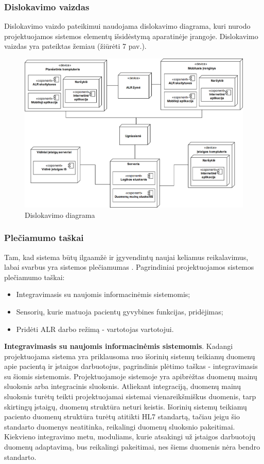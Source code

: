 \subsubsection{Dislokavimo vaizdas}
Dislokavimo vaizdo pateikimui naudojama dislokavimo diagrama, kuri nurodo projektuojamos sistemos elementų išsidėstymą aparatinėje įrangoje. Dislokavimo vaizdas yra pateiktas žemiau (žiūrėti 7 pav.).
\begin{figure}[H]
    \centering
    \includegraphics[scale=0.27]{images/deployment}
    \caption{Dislokavimo diagrama}
\end{figure}

\subsubsection{Plečiamumo taškai}
Tam, kad sistema būtų ilgaamžė ir įgyvendintų naujai keliamus reikalavimus, labai svarbus yra sistemos plečiamumas \cite{Bass2013}. Pagrindiniai projektuojamos sistemos plečiamumo taškai: 
\begin{itemize}
    \item Integravimasis su naujomis informacinėmis sistemomis;
    \item Sensorių, kurie matuoja pacientų gyvybines funkcijas, pridėjimas;
    \item Pridėti ALR darbo režimą - vartotojas vartotojui.
\end{itemize}

\textbf{Integravimasis su naujomis informacinėmis sistemomis}. Kadangi projektuojama sistema yra priklausoma nuo išorinių sistemų teikiamų duomenų apie pacientą ir įstaigos darbuotojus, pagrindinis plėtimo taškas - integravimasis su šiomis sistemomis. Projektuojamoje sistemoje yra apibrėžtas duomenų mainų sluoksnis arba integracinis sluoksnis. Atliekant integraciją, duomenų mainų sluoksnis turėtų teikti projektuojamai sistemai vienareikšmiškus duomenis, tarp skirtingų įstaigų, duomenų struktūra neturi keistis. Išorinių sistemų teikiamų paciento duomenų struktūra turėtų atitikti HL7 standartą, tačiau jeigu šio standarto duomenys neatitinka, reikalingi duomenų sluoksnio pakeitimai. Kiekvieno integravimo metu, moduliams, kurie atsakingi už įstaigos darbuotojų duomenų adaptavimą, bus reikalingi pakeitimai, nes šiems duomenis nėra bendro standarto.

